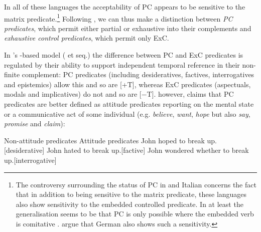 \documentclass[output=paper]{langsci/langscibook}
\begin{document}
In all of these languages the acceptability of \gls{PC} appears to be sensitive to the matrix  predicate.\footnote{The
controversy surrounding the status of \gls{PC} in
 and Italian concerns the fact that in addition to being sensitive to the
matrix  predicate, these languages also show sensitivity to the embedded
controlled predicate. In  at least the generalisation seems to be that
\gls{PC} is only possible where the embedded verb
is comitative \citep{Sheehan2014c,AuthierReed2018,PitteroffSheehan2018}.
\textcite{PitteroffEtAl2017a,PitteroffEtAl2017b} argue that German also shows
such a sensitivity.}  Following \textcite{Landau2000,Landau2004}, we
can thus make a distinction between \emph{PC predicates}, which permit either
partial or exhaustive  into their complements and \emph{exhaustive
control predicates}, which permit only \gls{ExC}.

In \citeauthor{Landau2000}’s -based model
(\citeyear{Landau2000,Landau2004} et seq.) the difference between
\gls{PC} and \gls{ExC} predicates is regulated by their ability to support independent
temporal reference in their non-finite complement: \gls{PC} predicates (including desideratives, factives, interrogatives and
    epistemics) allow this and so are [+T], whereas
    \gls{ExC} predicates (aspectuals, modals and
    implicatives) do not and so are [−T]. \citet{Pearson2016} however, claims
    that \gls{PC} predicates are better defined as
    attitude predicates reporting on the mental state or a communicative act of
    some individual (e.g. \emph{believe}, \emph{want}, \emph{hope} but also
    \emph{say}, \emph{promise} and \emph{claim}):

\ea\label{ex:24.8} Non-attitude predicates
	\z
\ex\label{ex:24.9} Attitude predicates
	\ea John hoped to break up.\hfill [desiderative]
	\ex John hated to break up.\hfill [factive]
	\ex John wondered whether to break up.\hfill [interrogative]
	\z
\z
\end{document}
